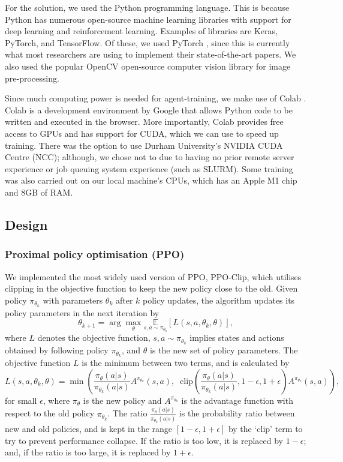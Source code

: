 \documentclass[12pt,a4paper]{article}
\begin{document}
For the solution, we used the Python programming language. This is because Python has numerous open-source machine learning libraries with support for deep learning and reinforcement learning. Examples of libraries are Keras, PyTorch, and TensorFlow. Of these, we used PyTorch \cite{NEURIPS2019_9015}, since this is currently what most researchers are using to implement their state-of-the-art papers. We also used the popular OpenCV \cite{opencv_library} open-source computer vision library for image pre-processing.

Since much computing power is needed for agent-training, we make use of Colab \cite{Bisong2019}. Colab is a development environment by Google that allows Python code to be written and executed in the browser. More importantly, Colab provides free access to GPUs and has support for CUDA, which we can use to speed up training. There was the option to use Durham University's NVIDIA CUDA Centre (NCC); although, we chose not to due to having no prior remote server experience or job queuing system experience (such as SLURM). Some training was also carried out on our local machine's CPUs, which has an Apple M1 chip and 8GB of RAM.

\subsection{Design}
\subsubsection{Proximal policy optimisation (PPO)}
We implemented the most widely used version of PPO, PPO-Clip, which utilises clipping in the objective function to keep the new policy close to the old. Given policy $\pi_{\theta_{k}}$ with parameters $\theta_k$ after $k$ policy updates, the algorithm updates its policy parameters in the next iteration by \[\theta_{k+1} = \arg \max_{\theta} \underset{s,a \sim \pi_{\theta_k}}{\mathbb{E}}\left[L(s,a,\theta_k, \theta)\right],\] where $L$ denotes the objective function, $s,a \sim \pi_{\theta_k}$ implies states and actions obtained by following policy $\pi_{\theta_{k}}$, and $\theta$ is the new set of policy parameters. The objective function $L$ is the minimum between two terms, and is calculated by \[L(s,a,\theta_k,\theta) = \min\left(\frac{\pi_{\theta}(a|s)}{\pi_{\theta_k}(a|s)}  A^{\pi_{\theta_k}}(s,a), \;\;\text{clip}\left(\frac{\pi_{\theta}(a|s)}{\pi_{\theta_k}(a|s)}, 1 - \epsilon, 1+\epsilon \right) A^{\pi_{\theta_k}}(s,a) \right),\] for small $\epsilon$, where $\pi_{\theta}$ is the new policy and $A^{\pi_{\theta_k}}$ is the advantage function with respect to the old policy $\pi_{\theta_{k}}$. The ratio $\frac{\pi_{\theta}(a|s)}{\pi_{\theta_k}(a|s)}$ is the probability ratio between new and old policies, and is kept in the range $\left[1 - \epsilon, 1 + \epsilon \right]$ by the `clip' term to try to prevent performance collapse. If the ratio is too low, it is replaced by $1 - \epsilon$; and, if the ratio is too large, it is replaced by $1 + \epsilon$. 
\end{document}
